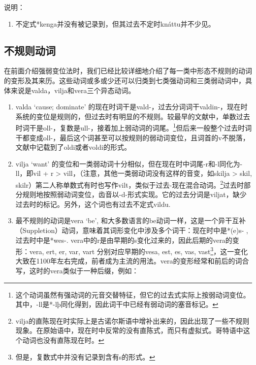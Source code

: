 说明：

\begin{enumerate}
\def\labelenumi{\arabic{enumi})}
\item
  不定式*kenga并没有被记录到，但其过去不定时knáttu并不少见。
\end{enumerate}

\subsection{不规则动词}\label{ux4e0dux89c4ux5219ux52a8ux8bcd}

在前面介绍强弱变位法时，我们已经比较详细地介绍了每一类中形态不规则的动词的变形及其来历。这些动词或多或少还可以归类到七类强动词和三类弱动词中，具体来说是valda，vilja和vera三个异态动词。

\begin{enumerate}
\def\labelenumi{\arabic{enumi}.}
\item
  valda `cause; dominate‌'
  的现在时词干是vald-，过去分词词干valdin-，现在时系统的变位是规则的，但过去时有明显的不规则。较最早的文献中，单数过去时词干是oll-，复数是ull-，接着加上弱动词的词尾。\footnote{这个动词虽然有强动词的元音交替特征，但它的过去式实际上按弱动词变位。其中，-ll是*-lþ同化得到，因此词干中已经有弱动词的塞音标记。}但后来一般整个过去时词干都变成oll-，最后这个词甚至可以按规则的弱动词变位，且词首的v不脱落，文献中记载到了oldi或者voldi的形式。
\item
  vilja `want‌'
  的变位和一类弱动词十分相似，但在现在时中词尾-r和-l同化为-ll，即vil + r
  \textgreater{} vill，（注意，其他一类弱动词没有这样的音变，如skilja
  \textgreater{} skil,
  skilr）第二人称单数式有时也写作vilt，类似于过去-现在混合动词。\footnote{vilja的直陈现在时实际上是古诺尔斯语中增补出来的，因此出现了一些不规则现象。在原始语中，现在时中反常的没有直陈式，而只有虚拟式。哥特语中这个动词也没有直陈现在时。}过去时部分规则地按照弱动词变位，齿音以-d-形式实现。它的过去分词是viljat，缺少过去时的标记。另外，这个词也有过去不定式vildu.
\item
  最不规则的动词是vera `be‌',
  和大多数语言的be动词一样，这是一个异干互补（Suppletion）动词，意味着其词形变化中涉及多个词干：现在时中是*(e)s-
  , 过去时中是*wes-.
  vera中的r是由早期的s变化过来的，因此后期的vera的变形：vera, ert, er,
  var, vart 分别对应早期的vesa, est, es, vas,
  vast\footnote{但是，复数式中并没有记录到含有s的形式。}，这一变化大致在1100年左右完成，前者成为主流的用法。vera的变形经常和前后的词合写，这时的vera类似于一种后缀，例如：
\end{enumerate}

